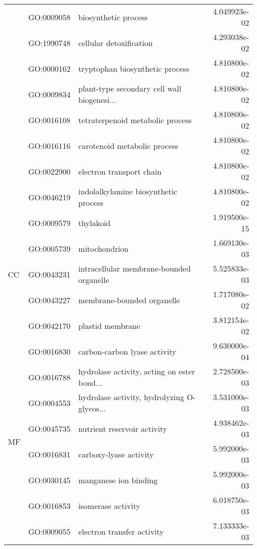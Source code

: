 \begin{longtable}{lllr}
   & GO:0009058 &                         biosynthetic process &  4.049923e-02 \\
   & GO:1990748 &                      cellular detoxification &  4.293038e-02 \\
   & GO:0000162 &              tryptophan biosynthetic process &  4.810800e-02 \\
   & GO:0009834 &  plant-type secondary cell wall biogenesi... &  4.810800e-02 \\
   & GO:0016108 &             tetraterpenoid metabolic process &  4.810800e-02 \\
   & GO:0016116 &                 carotenoid metabolic process &  4.810800e-02 \\
   & GO:0022900 &                     electron transport chain &  4.810800e-02 \\
   & GO:0046219 &         indolalkylamine biosynthetic process &  4.810800e-02 \\
\cline{1-4}
\multirow{5}{*}{CC} & GO:0009579 &                                    thylakoid &  1.919500e-15 \\
   & GO:0005739 &                                mitochondrion &  1.669130e-03 \\
   & GO:0043231 &     intracellular membrane-bounded organelle &  5.525833e-03 \\
   & GO:0043227 &                   membrane-bounded organelle &  1.717080e-02 \\
   & GO:0042170 &                             plastid membrane &  3.812154e-02 \\
\cline{1-4}
\multirow{22}{*}{MF} & GO:0016830 &                 carbon-carbon lyase activity &  9.630000e-04 \\
   & GO:0016788 &  hydrolase activity, acting on ester bond... &  2.728500e-03 \\
   & GO:0004553 &  hydrolase activity, hydrolyzing O-glycos... &  3.531000e-03 \\
   & GO:0045735 &                  nutrient reservoir activity &  4.938462e-03 \\
   & GO:0016831 &                       carboxy-lyase activity &  5.992000e-03 \\
   & GO:0030145 &                        manganese ion binding &  5.992000e-03 \\
   & GO:0016853 &                           isomerase activity &  6.018750e-03 \\
   & GO:0009055 &                   electron transfer activity &  7.133333e-03 \\

\end{longtable}
